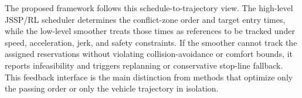 \begin{addedtodayblock}
The proposed framework follows this schedule-to-trajectory view. The high-level JSSP/RL scheduler determines the conflict-zone order and target entry times, while the low-level smoother treats those times as references to be tracked under speed, acceleration, jerk, and safety constraints. If the smoother cannot track the assigned reservations without violating collision-avoidance or comfort bounds, it reports infeasibility and triggers replanning or conservative stop-line fallback. This feedback interface is the main distinction from methods that optimize only the passing order or only the vehicle trajectory in isolation.
\end{addedtodayblock}
